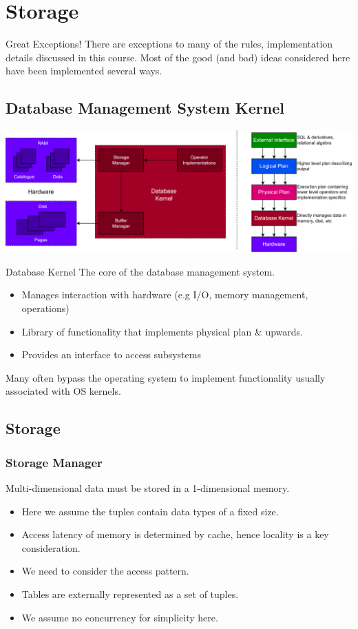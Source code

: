 \chapter{Storage}
\begin{sidenotebox}{Great Exceptions!}
    There are exceptions to many of the rules, implementation details discussed in this course. Most of the good (and bad) ideas considered here have been implemented several ways.
\end{sidenotebox}

\section{Database Management System Kernel}
\begin{center}
    \includegraphics[width=.8\textwidth]{storage/images/kernel_architecture.drawio.png}
\end{center}

\begin{definitionbox}{Database Kernel}
    The core of the database management system.
    \begin{itemize}
        \item Manages interaction with hardware (e.g I/O, memory management, operations)
        \item Library of functionality that implements physical plan \& upwards.
        \item Provides an interface to access subsystems
    \end{itemize}
    Many often bypass the operating system to implement functionality usually associated with OS kernels.
\end{definitionbox}

\section{Storage}
\subsection{Storage Manager}
Multi-dimensional data must be stored in a 1-dimensional memory.
\begin{itemize}
    \item Here we assume the tuples contain data types of a fixed size.
    \item Access latency of memory is determined by cache, hence locality is a key consideration.
    \item We need to consider the access pattern.
    \item Tables are externally represented as a set of tuples.
    \item We assume no concurrency for simplicity here.
\end{itemize}


